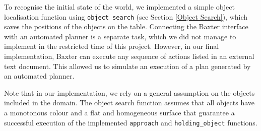 To recognise the initial state of the world, we implemented a simple object localisation function using \texttt{object search} (see Section \ref{Object Search}), which saves the positions of the objects on the table.
Connecting the Baxter interface with an automated planner is a separate task, which we did not manage to implement in the restricted time of this project.
However, in our final implementation, Baxter can execute any sequence of actions listed in an external text document.
This allowed us to simulate an execution of a plan generated by an automated planner.

Note that in our implementation, we rely on a general assumption on the objects included in the domain.
The object search function assumes that all objects have a monotonous colour and a flat and homogeneous surface that guarantee a successful execution of the implemented \texttt{approach} and \texttt{holding_object} functions.



%

